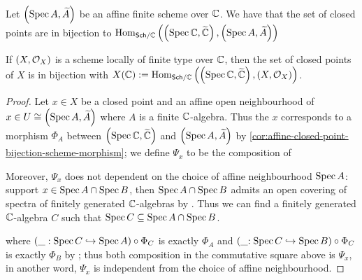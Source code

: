 \begin{corollary}\label{cor:affine-closed-point-bijection-scheme-morphism}
  Let $\left(\operatorname*{Spec}{A}, \widetilde{A}\right)$ be an affine finite scheme over $\mathbb{C}$. We have that the set of closed points are in bijection to $\operatorname{Hom}_{\mathsf{Sch}/\mathbb{C}}{\left(\left(\operatorname*{Spec}{\mathbb{C}}, \widetilde{\mathbb{C}}\right), \left(\operatorname*{Spec}{A}, \widetilde{A}\right)\right)}$
\end{corollary}

\begin{proposition}
  If $\left(X, \mathcal{O}_{X}\right)$ is a scheme locally of finite type over $\mathbb{C}$, then the set of closed points of $X$ is in bijection with $X(\mathbb{C}) := \operatorname{Hom}_{\mathsf{Sch}/\mathbb{C}}\left(\left(\operatorname*{Spec}{\mathbb{C}}, \widetilde{\mathbb{C}}\right), \left(X, \mathcal{O}_{X}\right)\right)$.
\end{proposition}

\begin{proof}
  Let $x \in X$ be a closed point and an affine open neighbourhood of $x \in U \cong \left(\operatorname*{Spec}{A}, \widetilde{A}\right)$ where $A$ is a finite $\mathbb{C}$-algebra. Thus the $x$ corresponds to a morphism $\Phi_{A}$ between $\left(\operatorname*{Spec}{\mathbb{C}}, \widetilde{\mathbb{C}}\right)$ and $\left(\operatorname*{Spec}{A}, \widetilde{A}\right)$ by \cref{cor:affine-closed-point-bijection-scheme-morphism}; we define $\Psi_{x}$ to be the composition of
  \begin{center}
  \end{center}
  Moreover, $\Psi_{x}$ does not dependent on the choice of affine neighbourhood $\operatorname{Spec} A$: support $x \in \operatorname{Spec} A \cap \operatorname{Spec} B$, then $\operatorname{Spec} A \cap \operatorname{Spec} B$ admits an open covering of spectra of finitely generated $\mathbb{C}$-algebras by . Thus we can find a finitely generated $\mathbb{C}$-algebra $C$ such that $\operatorname{Spec} C \subseteq \operatorname{Spec} A \cap \operatorname{Spec} B$.
  \begin{center}
  \end{center}
  where $ (\_: \operatorname{Spec} C \hookrightarrow \operatorname{Spec} A) \circ \Phi_{C}$ is exactly $\Phi_{A}$ and $(\_{: \operatorname{Spec} C \hookrightarrow \operatorname{Spec} B}) \circ \Phi_{C}$ is exactly $\Phi_{B}$ by ; thus both composition in the commutative square above is $\Psi_{x}$, in another word, $\Psi_{x}$ is independent from the choice of affine neighbourhood.


\end{proof}
